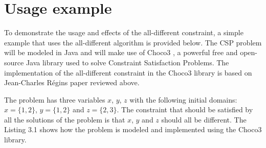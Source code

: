 \documentclass{l4proj}
\begin{document}
\section{Usage example}
\noindent To demonstrate the usage and effects of the all-different constraint, a simple example that uses the all-different algorithm is provided below. The CSP problem will be modeled in Java and will make use of Choco3 \cite{choco}, a powerful free and open-source Java library used to solve Constraint Satisfaction Problems. The implementation of the all-different constraint in the Choco3 library is based on Jean-Charles R\'egin\textquotesingle s paper \cite{regin1994filtering} reviewed above.

\noindent The problem has three variables $x$, $y$, $z$ with the following initial domains: $x = \{1, 2\}$, $y = \{1, 2\}$ and $z = \{2, 3\}$. The constraint that should be satisfied by all the solutions of the problem is that $x$, $y$ and $z$ should all be different. The Listing 3.1 shows how the problem is modeled and implemented using the Choco3 library.

\vspace*{1cm}

\end{document}
